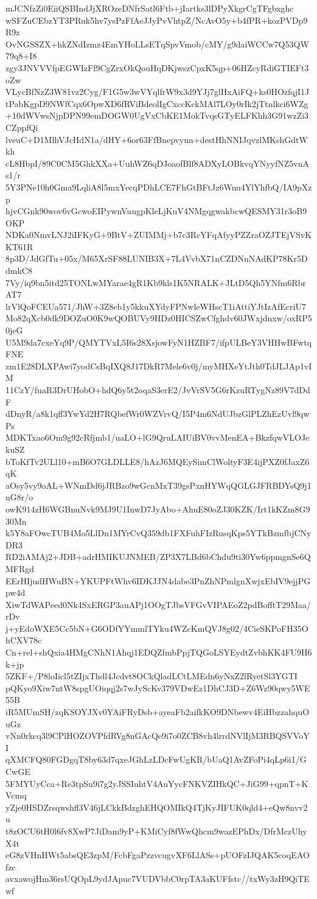 mJCNfzZi0EiiQSBIndJjXROzeDNfrSatl6Ftb+jIartks3lDPyXkgrCgTFgbxghc
wSFZuCEbzYT3PRuk5hv7ysPzFfAeJJyPvVhtpZ/NcAvO5y+b4fPR+kozPVDp9R9z
OvNGSSZX+hkZNdIzmz4EmYHoLLsETqSpvVmob/cMY/g9daiWCCw7Q53QW79q8+I8
zgy3JNVVVfpEGWIzFf9CgZrxOkQouHqDKjwszCpxK5qp+06HZcyRdiGTIEFt3oZw
VLycBfNzZ3W81vz2Cyg/F1G5w3wVYqlfrW9x3d9YJj7glHxAiFQ+ks0HOzfqjI1J
tPabKgpD9NWfCqx6OpwXD6fRViBdeolIgCxccKckMAl7LOy0rIk2jTtnlkci6WZg
+10dWVwsNjpDPN99emDOGW0UgVxCbKE1MokTvqsGTyELFKhh3G91wzZi3CZppfQi
lveuC+D1MlhVJcHdN1a/dHY+6or63FfBnepvyun+destHhNNIJqvzlMKshGdtWkh
cL8HbpI/89C0CM5GhkXXa+UuhWZ6qDJoaofBlf8ADXyLOBkvqYNyyfNZ5vnAs1/r
5Y3PNe10h0Gma9LqliA8l5mxYecqPDhLCE7FhGtBFtJz6Wnu4YlYhfbQ/IA9pXzp
hjvCGnk90wov6vGcwoEIPywnVuugpKleLjKuV4NMgqgwakbcwQESMY31r3oB9OKP
NDKa0NmvLNJ2iIFKyG+9BtV+ZUIMMj+b7c3RcYFqAfyyPZZraOZJTEjVSvKKT61R
8p3D/JdGfTu+05x/M65XrSF88LUNIB3X+7L4VvbX71nCZDNnNAdKP78Kr5DdmkC8
7Vy/iq9bn5itd25TONLwMYarae4gR1Kb9kls1K5NRALK+JLtD5Qh5YNfm6RbrAT7
lrVlQoFCEUa571/JhW+3Z8eb1y5kkuXYdyFPNwleWHscT1iAttiYJtIzAfEcriU7
Mo82qXcb0dk9DOZuO0K9wQOBUVy9HDz0HICSZwCfghdv60JWxjdnxw/oxRP50jeG
U5M9da7cxeYq9P/QMYTVxL5I6s28XsjowFyN1HZBF7/ifpULBeY3VHHwBFwtqFNE
zm1E28DLXPAwi7yodCsBqIXQ8J17DkR7Mele6v0j/myMHXeYtJth0TdJLJAp1vIM
11CzY/fuaR3DrUHobO+hdQ6y5t2oqaS3erE2/JvVrSV5G6rKzuRTygNz89V7dDdF
dDnyR/a8k1qff3YwYd2H7RQbefWr0WZVrvQ/I5P4m6NdUJbzGlPLZhEzUvl9qwPs
MDKTxao6Om9g92cRfjmb1/uaLO+lG9QruLAIUiBV0vvMenEA+BkzfqwVLOJekuSZ
bToKfTv2ULl10+mB6O7GLDLLE8/hAzJ6MQEySimClWoltyF3E4ijPXZ0fJaxZ6qK
aOsy5vy9oAL+WNmDd6jJRBzo9wGcnMxT39gsPxnHYWqQGLGJFRBDYsQ9j1nG8r/o
owK914zH6WGBnuNvk9MJ9U1InwD7JyAbo+AhuE80oZJ30KZK/Irt1kKZm8G930Mn
k5Y8aFOwcTUB4Mo5LlDn1MYrCvQ359db1FXFuhFIzRusqKps5YTkBzmfbjCNyDR3
RD2iAMAj2+JDB+adrHMIKUJNMEB/ZP3X7LBd6bChdu9ti30Yw6ppmgnSe6QMFRgd
EErHIjudHWuBN+YKUPFtWhv6IDKJJN4dabe3PnZhNPmlgnXwjxEbIV9ejjPGpw4d
XiwTdWAPeed0Nk4SxERGP3auAPj1OOgTJbsVFGvVIPAEoZ2pdBofftT29Maa/rDv
j+yEdoWXE5Cc5bN+G6ODfYYmmlTYku4WZcKmQVJ8g02/4CieSKPoFH35OhCXV78c
Cn+rel+shQxia4HMgCNhN1Ahqj1EDQZfmbPpjTQGoLSYEydtZvbhKK4FU9H6k+jp
5ZKF+/P8loIicl5tZIjxThdl4Jcdvt8OCkQladLCtLMEdn6yNxZ2lRyetSl3YGTI
pQKyo9Xiw7ntW8spgUOiqqj2s7wJyScKv379VDwEz1DhCJ3D+Z6Wz90qwy5WE55B
iR5MUmSH/zqKSOYJXv0YAiFRyDsb+ayeaFb2aifkKO9DNbewv4EiHbzzahquOuGz
vNn0rkcq3l9CPlHOZOVPfdRVg8nGAcQe9i7o0ZCB8vh4lrrdNVlIjM3RBQSVVoYI
qXMCFQ80FGDgqT8by63d7qxeJGhLzLDcFwUgKR/bUaQ1AvZFoPi4qLp6i1/GCwGE
5FMYUyCca+Re3tpSu9i7g2yJSSIuhtV4AuYycFNKVZIHkQC+JiG99+qpnT+KVcmq
yZje0HSDZrsqwshfl3V46jLCkkBdzghEHQOMIkQ4TjKyJIFUK0qld4+eQw8nvv2u
t8zOCU6tH0l6fv8XwP7JiDam9yP+KMiCyf8fWwQhcm9wazEPhDx/DfrMczUhyX4t
eG8zVHnHWt5absQE3zpM/FcbFgaPzzvcugvXF6LlASs+pUOFzIJQAK5coqEAOfzc
avxawojHm36rsUQOpL9ydJApuc7VUDVbbC0rpTA3aKUFfstc//txWy3zH9QiTEwf
